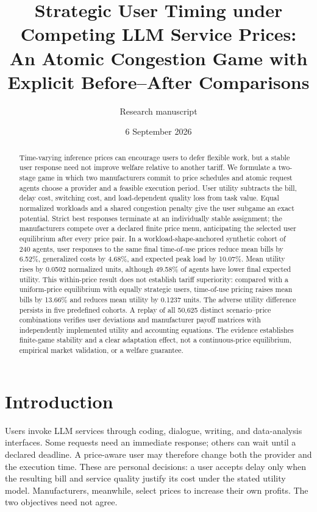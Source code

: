 \documentclass[11pt,a4paper]{article}
\title{Strategic User Timing under Competing LLM Service Prices:\\An Atomic Congestion Game with Explicit Before--After Comparisons}
\author{Research manuscript}
\date{6 September 2026}
\begin{document}
\maketitle
\begin{abstract}
Time-varying inference prices can encourage users to defer flexible work, but a stable user response need not improve welfare relative to another tariff. We formulate a two-stage game in which two manufacturers commit to price schedules and atomic request agents choose a provider and a feasible execution period. User utility subtracts the bill, delay cost, switching cost, and load-dependent quality loss from task value. Equal normalized workloads and a shared congestion penalty give the user subgame an exact potential. Strict best responses terminate at an individually stable assignment; the manufacturers compete over a declared finite price menu, anticipating the selected user equilibrium after every price pair. In a workload-shape-anchored synthetic cohort of 240 agents, user responses to the same final time-of-use prices reduce mean bills by 6.52\%, generalized costs by 4.68\%, and expected peak load by 10.07\%. Mean utility rises by 0.0502 normalized units, although 49.58\% of agents have lower final expected utility. This within-price result does not establish tariff superiority: compared with a uniform-price equilibrium with equally strategic users, time-of-use pricing raises mean bills by 13.66\% and reduces mean utility by 0.1237 units. The adverse utility difference persists in five predefined cohorts. A replay of all 50,625 distinct scenario--price combinations verifies user deviations and manufacturer payoff matrices with independently implemented utility and accounting equations. The evidence establishes finite-game stability and a clear adaptation effect, not a continuous-price equilibrium, empirical market validation, or a welfare guarantee.
\end{abstract}

\section{Introduction}
Users invoke LLM services through coding, dialogue, writing, and data-analysis interfaces. Some requests need an immediate response; others can wait until a declared deadline. A price-aware user may therefore change both the provider and the execution time. These are personal decisions: a user accepts delay only when the resulting bill and service quality justify its cost under the stated utility model. Manufacturers, meanwhile, select prices to increase their own profits. The two objectives need not agree.
\end{document}

